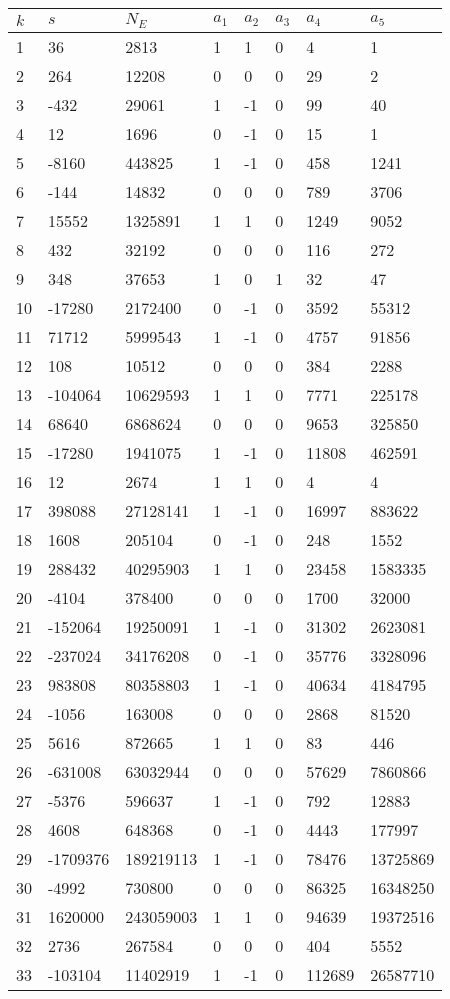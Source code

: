 \documentclass{amsart}
\begin{document}
\begin{longtable}{|l|l|l|lllll|}
\hline
$k$ & $s$ & $N_E$ & $a_1$ & $a_2$ & $a_3$ & $a_4$ & $a_5$\\
\hline
1&36&2813&1&1&0&4&1\\
2&264&12208&0&0&0&29&2\\
3&-432&29061&1&-1&0&99&40\\
4&12&1696&0&-1&0&15&1\\
5&-8160&443825&1&-1&0&458&1241\\
6&-144&14832&0&0&0&789&3706\\
7&15552&1325891&1&1&0&1249&9052\\
8&432&32192&0&0&0&116&272\\
9&348&37653&1&0&1&32&47\\
10&-17280&2172400&0&-1&0&3592&55312\\
11&71712&5999543&1&-1&0&4757&91856\\
12&108&10512&0&0&0&384&2288\\
13&-104064&10629593&1&1&0&7771&225178\\
14&68640&6868624&0&0&0&9653&325850\\
15&-17280&1941075&1&-1&0&11808&462591\\
16&12&2674&1&1&0&4&4\\
17&398088&27128141&1&-1&0&16997&883622\\
18&1608&205104&0&-1&0&248&1552\\
19&288432&40295903&1&1&0&23458&1583335\\
20&-4104&378400&0&0&0&1700&32000\\
21&-152064&19250091&1&-1&0&31302&2623081\\
22&-237024&34176208&0&-1&0&35776&3328096\\
23&983808&80358803&1&-1&0&40634&4184795\\
24&-1056&163008&0&0&0&2868&81520\\
25&5616&872665&1&1&0&83&446\\
26&-631008&63032944&0&0&0&57629&7860866\\
27&-5376&596637&1&-1&0&792&12883\\
28&4608&648368&0&-1&0&4443&177997\\
29&-1709376&189219113&1&-1&0&78476&13725869\\
30&-4992&730800&0&0&0&86325&16348250\\
31&1620000&243059003&1&1&0&94639&19372516\\
32&2736&267584&0&0&0&404&5552\\
33&-103104&11402919&1&-1&0&112689&26587710\\

\end{longtable}
\end{document}
